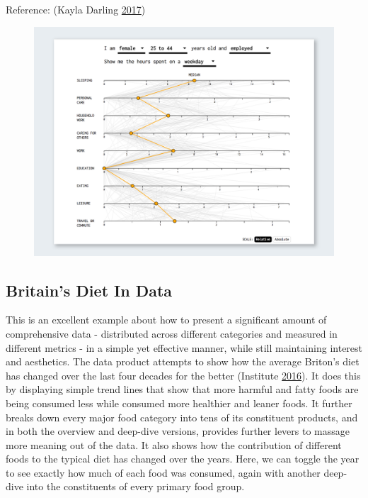 \documentclass[]{book}
\begin{document}
Reference: (Kayla Darling \protect\hyperlink{ref-cool_data}{2017})

\begin{figure}
\centering
\includegraphics{images/SpendingTime.png}
\caption{}
\end{figure}

\subsection{Britain's Diet In Data}\label{britains-diet-in-data}

This is an excellent example about how to present a significant amount
of comprehensive data - distributed across different categories and
measured in different metrics - in a simple yet effective manner, while
still maintaining interest and aesthetics. The data product attempts to
show how the average Briton's diet has changed over the last four
decades for the better (Institute
\protect\hyperlink{ref-britain_diet_2016}{2016}). It does this by
displaying simple trend lines that show that more harmful and fatty
foods are being consumed less while consumed more healthier and leaner
foods. It further breaks down every major food category into tens of its
constituent products, and in both the overview and deep-dive versions,
provides further levers to massage more meaning out of the data. It also
shows how the contribution of different foods to the typical diet has
changed over the years. Here, we can toggle the year to see exactly how
much of each food was consumed, again with another deep-dive into the
constituents of every primary food group.
\end{document}
